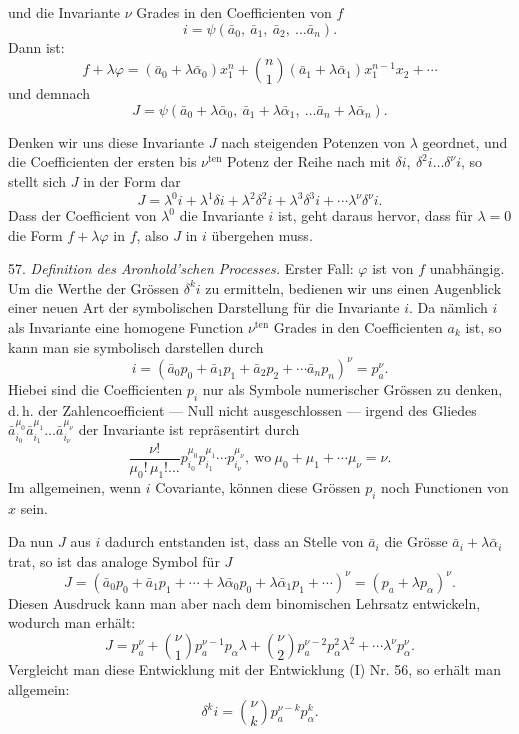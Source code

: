\documentclass[11pt]{article}
\providecommand{\weberpage}[1]{}
\begin{document}
\weberpage{61}
und die Invariante $\nu$ Grades in den Coefficienten von $f$
\[
i = \psi (\bar a_0,\ \bar a_1,\ \bar a_2,\ \ldots \bar a_n).
\]
Dann ist:
\[
f + \lambda\varphi = (\bar a_0 + \lambda \bar\alpha_0)x_1^n + \binom{n}{1}(\bar a_1+\lambda\bar\alpha_1)x_1^{n-1}x_2 + \cdots
\]
und demnach
\[
J = \psi (\bar a_0+\lambda\bar\alpha_0,\ \bar a_1+\lambda\bar\alpha_1,\ \ldots \bar a_n+\lambda\bar\alpha_n).
\]

Denken wir uns diese Invariante $J$ nach steigenden Potenzen von
$\lambda$ geordnet, und die Coefficienten der ersten bis $\nu^{\text{ten}}$ Potenz der Reihe
nach mit $\delta i,\ \delta^2 i \ldots \delta^\nu i$, so stellt sich $J$ in der Form
dar
\[
J = \lambda^0 i + \lambda^1 \delta i + \lambda^2 \delta^2 i + \lambda^3 \delta^3 i + \cdots \lambda^\nu \delta^\nu i. \tag{I}
\]
Dass der Coefficient von $\lambda^0$ die Invariante $i$ ist, geht daraus hervor,
dass für $\lambda = 0$ die Form $f+\lambda\varphi$ in $f$, also $J$ in $i$ übergehen muss.

57. \textit{Definition des Aronhold'schen Processes.} Erster Fall: $\varphi$ ist
von $f$ unabhängig. Um die Werthe der Grössen $\delta^k i$ zu ermitteln,
bedienen wir uns einen Augenblick einer neuen Art der symbolischen
Darstellung für die Invariante $i$. Da nämlich $i$ als Invariante eine
homogene Function $\nu^{\text{ten}}$ Grades in den Coefficienten $a_k$ ist, so kann
man sie symbolisch darstellen durch
\[
i = (\bar a_0 p_0 + \bar a_1 p_1 + \bar a_2 p_2 + \cdots \bar a_n p_n)^\nu = p_a^\nu.
\]
Hiebei sind die Coefficienten $p_i$ nur als Symbole numerischer
Grössen zu denken, d.\,h. der Zahlencoefficient --- Null nicht ausge\-schlossen --- irgend des Gliedes $\bar a_{i_0}^{\mu_0}\bar a_{i_1}^{\mu_1}\ldots\bar a_{i_\nu}^{\mu_\nu}$ der Invariante ist repräsentirt durch
\[
\frac{\nu!}{\mu_0!\,\mu_1!\ldots}p_{i_0}^{\mu_0}p_{i_1}^{\mu_1}\cdots p_{i_\nu}^{\mu_\nu},\ \text{wo}\ \mu_0+\mu_1+\cdots\mu_\nu = \nu.
\]
Im allgemeinen, wenn $i$ Covariante, können diese Grössen $p_i$ noch
Functionen von $x$ sein.

Da nun $J$ aus $i$ dadurch entstanden ist, dass an Stelle von $\bar a_i$ die
Grösse $\bar a_i + \lambda\bar\alpha_i$ trat, so ist das analoge Symbol für $J$
\[
J = (\bar a_0 p_0+\bar a_1 p_1+\cdots+\lambda\bar\alpha_0 p_0+\lambda\bar\alpha_1 p_1+\cdots)^\nu = (p_a+\lambda p_\alpha)^\nu.
\]
Diesen Ausdruck kann man aber nach dem binomischen Lehrsatz ent\-wickeln, wodurch man erhält:
\[
J = p_a^\nu + \binom{\nu}{1}p_a^{\nu-1}p_\alpha\lambda + \binom{\nu}{2}p_a^{\nu-2}p_\alpha^2\lambda^2 + \cdots \lambda^\nu p_\alpha^\nu. \tag{II}
\]
Vergleicht man diese Entwicklung mit der Entwicklung (I) Nr. 56,
so erhält man allgemein:
\[
\delta^k i = \binom{\nu}{k}p_a^{\nu-k}p_\alpha^k. \tag{I}
\]
\end{document}
